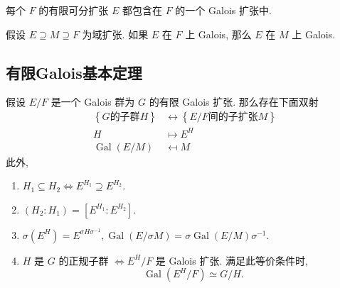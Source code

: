 \begin{corollary}
  \label{corollary-finite-separable-extension-contained-in-a-Galois-extension}
  每个 \( F \) 的有限可分扩张 \( E \) 都包含在 \( F \) 的一个 Galois 扩张中.
\end{corollary}

\begin{corollary}
  假设 \( E \supseteq M \supseteq F \) 为域扩张.
  如果 \( E \) 在 \( F \) 上 Galois, 那么 \( E \) 在 \( M \) 上 Galois.
\end{corollary}

\subsection{有限Galois基本定理}

\begin{theorem}[有限Galois基本定理]
  \label{theorem-finite-Galois-fundamental-theorem}
  假设 \( E/F \) 是一个 Galois 群为 \( G \) 的有限 Galois 扩张.
  那么存在下面双射
  \[
    \begin{split}
      \left\lbrace G \text{的子群} H \right\rbrace &\leftrightarrow \left\lbrace
      E/F \text{间的子扩张} M \right\rbrace\\
        H &\mapsto E^H\\
        \operatorname{Gal}(E/M) &\mapsfrom M
    \end{split}
  \]
  此外,
  \begin{enumerate}
    \item \( H_1 \subseteq H_2 \iff E^{H_1} \supseteq E^{H_2} \).
    \item \( (H_2: H_1) = [E^{H_1} : E^{H_2}] \).
    \item \( \sigma(E^H) = E^{\sigma H \sigma^{-1}},
      \operatorname{Gal}(E/\sigma M) = \sigma \operatorname{Gal}(E/M)\sigma^{-1}
      \).
    \item \( H \) 是 \( G \) 的正规子群 \( \iff  E^H / F \) 是 Galois 扩张.
      满足此等价条件时,
      \[
        \operatorname{Gal}(E^H/F) \simeq G / H.
      \]
  \end{enumerate}
\end{theorem}
